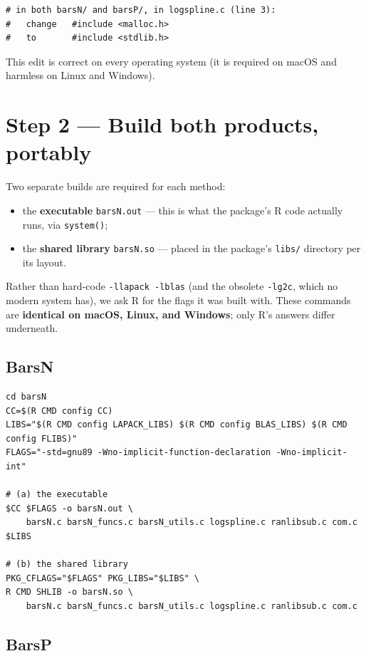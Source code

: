 \documentclass[11pt]{article}
\begin{document}
\begin{lstlisting}
# in both barsN/ and barsP/, in logspline.c (line 3):
#   change   #include <malloc.h>
#   to       #include <stdlib.h>
\end{lstlisting}

This edit is correct on every operating system (it is required on macOS and
harmless on Linux and Windows).

\section{Step 2 --- Build both products, portably}
\label{sec:build}

Two separate builds are required for each method:
\begin{itemize}[leftmargin=1.4em,itemsep=2pt]
  \item the \textbf{executable} \texttt{barsN.out} --- this is what the package's
        R code actually runs, via \texttt{system()};
  \item the \textbf{shared library} \texttt{barsN.so} --- placed in the package's
        \texttt{libs/} directory per its layout.
\end{itemize}

Rather than hard-code \texttt{-llapack -lblas} (and the obsolete \texttt{-lg2c},
which no modern system has), we ask R for the flags it was built with. These
commands are \textbf{identical on macOS, Linux, and Windows}; only R's answers
differ underneath.

\subsection*{BarsN}

\begin{lstlisting}
cd barsN
CC=$(R CMD config CC)
LIBS="$(R CMD config LAPACK_LIBS) $(R CMD config BLAS_LIBS) $(R CMD config FLIBS)"
FLAGS="-std=gnu89 -Wno-implicit-function-declaration -Wno-implicit-int"

# (a) the executable
$CC $FLAGS -o barsN.out \
    barsN.c barsN_funcs.c barsN_utils.c logspline.c ranlibsub.c com.c $LIBS

# (b) the shared library
PKG_CFLAGS="$FLAGS" PKG_LIBS="$LIBS" \
R CMD SHLIB -o barsN.so \
    barsN.c barsN_funcs.c barsN_utils.c logspline.c ranlibsub.c com.c
\end{lstlisting}

\subsection*{BarsP}
\end{document}
